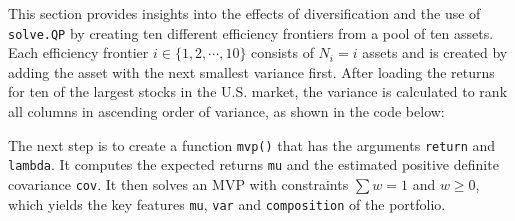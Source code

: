 \documentclass[
  oneside]{book}
\newenvironment{Shaded}{\begin{snugshade}}{\end{snugshade}}
\newcommand{\AttributeTok}[1]{\textcolor[rgb]{0.77,0.63,0.00}{#1}}
\newcommand{\CommentTok}[1]{\textcolor[rgb]{0.56,0.35,0.01}{\textit{#1}}}
\newcommand{\FunctionTok}[1]{\textcolor[rgb]{0.00,0.00,0.00}{#1}}
\newcommand{\NormalTok}[1]{#1}
\newcommand{\OtherTok}[1]{\textcolor[rgb]{0.56,0.35,0.01}{#1}}
\newcommand{\SpecialCharTok}[1]{\textcolor[rgb]{0.00,0.00,0.00}{#1}}
\newcommand{\StringTok}[1]{\textcolor[rgb]{0.31,0.60,0.02}{#1}}
\begin{document}
This section provides insights into the effects of diversification and the use of \texttt{solve.QP} by creating ten different efficiency frontiers from a pool of ten assets. Each efficiency frontier \(i \in \{1, 2, \cdots, 10\}\) consists of \(N_i = i\) assets and is created by adding the asset with the next smallest variance first. After loading the returns for ten of the largest stocks in the U.S. market, the variance is calculated to rank all columns in ascending order of variance, as shown in the code below:

\begin{Shaded}
\end{Shaded}

The next step is to create a function \texttt{mvp()} that has the arguments \texttt{return} and \texttt{lambda}. It computes the expected returns \texttt{mu} and the estimated positive definite covariance \texttt{cov}. It then solves an MVP with constraints \(\textstyle\sum w = 1\) and \(w \geq 0\), which yields the key features \texttt{mu}, \texttt{var} and \texttt{composition} of the portfolio.
\end{document}
